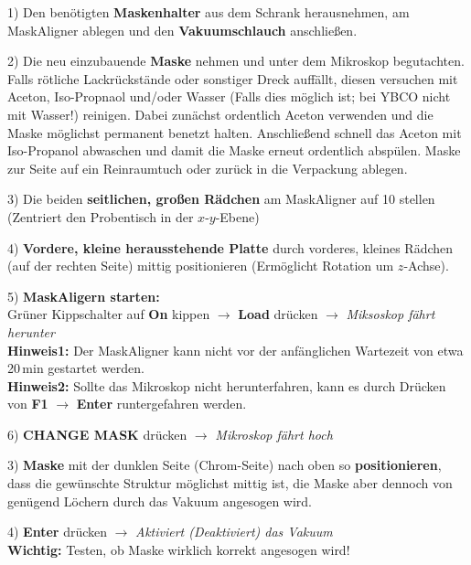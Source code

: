 \documentclass[
  ngerman,
  twoside,
  captions=tableheading,
  BCOR=.5cm,
  fontsize=11,
  ]{scrreprt}
\begin{document}
\begin{description}
\item 1) Den benötigten \textbf{Maskenhalter} aus dem Schrank herausnehmen, am MaskAligner ablegen und den \textbf{Vakuumschlauch} anschließen.

\item 2) Die neu einzubauende \textbf{Maske} nehmen und unter dem Mikroskop begutachten. Falls rötliche Lackrückstände oder sonstiger Dreck auffällt, diesen versuchen mit Aceton, Iso-Propnaol und/oder Wasser (Falls dies möglich ist; bei YBCO nicht mit Wasser!) reinigen. Dabei zunächst ordentlich Aceton verwenden und die Maske möglichst permanent benetzt halten. Anschließend schnell das Aceton mit Iso-Propanol abwaschen und damit die Maske erneut ordentlich abspülen. Maske zur Seite auf ein Reinraumtuch oder zurück in die Verpackung ablegen. 

\item 3) Die beiden \textbf{seitlichen, großen Rädchen} am MaskAligner auf 10 stellen (Zentriert den Probentisch in der $x$-$y$-Ebene)

\item 4) \textbf{Vordere, kleine herausstehende Platte} durch vorderes, kleines Rädchen (auf der rechten Seite) mittig positionieren (Ermöglicht Rotation um $z$-Achse).
\item 5) \textbf{MaskAligern starten:}\\ 
Grüner Kippschalter auf \textbf{On} kippen $\rightarrow$ \textbf{Load} drücken $\rightarrow$ \textit{Miksoskop fährt herunter}\\
\textbf{Hinweis1:} Der MaskAligner kann nicht vor der anfänglichen Wartezeit von etwa 20\,min gestartet werden.\\
\textbf{Hinweis2:} Sollte das Mikroskop nicht herunterfahren, kann es durch Drücken von \textbf{F1} $\rightarrow$ \textbf{Enter} runtergefahren werden.

\item 6) \textbf{CHANGE MASK} drücken $\rightarrow$ \textit{Mikroskop fährt hoch}

\item 3) \textbf{Maske} mit der dunklen Seite (Chrom-Seite) nach oben so \textbf{positionieren}, dass die gewünschte Struktur möglichst mittig ist, die Maske aber dennoch von genügend Löchern durch das Vakuum angesogen wird.

\item 4) \textbf{Enter} drücken $\rightarrow$ \textit{Aktiviert (Deaktiviert) das Vakuum}\\
\textbf{Wichtig:} Testen, ob Maske wirklich korrekt angesogen wird!


\end{description}
\end{document}

